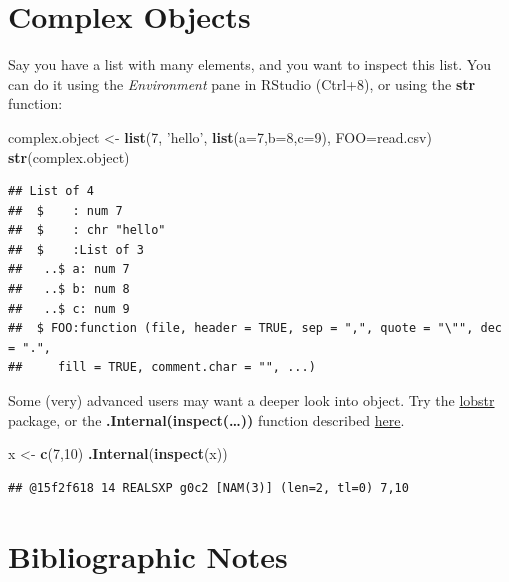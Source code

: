 \documentclass[]{book}
\newenvironment{Shaded}{\begin{snugshade}}{\end{snugshade}}
\newcommand{\KeywordTok}[1]{\textcolor[rgb]{0.13,0.29,0.53}{\textbf{#1}}}
\newcommand{\DataTypeTok}[1]{\textcolor[rgb]{0.13,0.29,0.53}{#1}}
\newcommand{\DecValTok}[1]{\textcolor[rgb]{0.00,0.00,0.81}{#1}}
\newcommand{\StringTok}[1]{\textcolor[rgb]{0.31,0.60,0.02}{#1}}
\newcommand{\NormalTok}[1]{#1}
\theoremstyle{definition}
\theoremstyle{definition}
\theoremstyle{definition}
\theoremstyle{remark}
\begin{document}
\section{Complex Objects}\label{complex-objects}

Say you have a list with many elements, and you want to inspect this
list. You can do it using the \emph{Environment} pane in RStudio
(Ctrl+8), or using the \textbf{str} function:

\begin{Shaded}
\begin{Highlighting}[]
\NormalTok{complex.object <-}\StringTok{ }\KeywordTok{list}\NormalTok{(}\DecValTok{7}\NormalTok{, }\StringTok{'hello'}\NormalTok{, }\KeywordTok{list}\NormalTok{(}\DataTypeTok{a=}\DecValTok{7}\NormalTok{,}\DataTypeTok{b=}\DecValTok{8}\NormalTok{,}\DataTypeTok{c=}\DecValTok{9}\NormalTok{), }\DataTypeTok{FOO=}\NormalTok{read.csv)}
\KeywordTok{str}\NormalTok{(complex.object)}
\end{Highlighting}
\end{Shaded}

\begin{verbatim}
## List of 4
##  $    : num 7
##  $    : chr "hello"
##  $    :List of 3
##   ..$ a: num 7
##   ..$ b: num 8
##   ..$ c: num 9
##  $ FOO:function (file, header = TRUE, sep = ",", quote = "\"", dec = ".", 
##     fill = TRUE, comment.char = "", ...)
\end{verbatim}

Some (very) advanced users may want a deeper look into object. Try the
\href{https://github.com/r-lib/lobstr/blob/master/README.md}{lobstr}
package, or the \textbf{.Internal(inspect(\ldots{}))} function described
\href{https://www.brodieg.com/2019/02/18/an-unofficial-reference-for-internal-inspect/}{here}.

\begin{Shaded}
\begin{Highlighting}[]
\NormalTok{x <-}\StringTok{ }\KeywordTok{c}\NormalTok{(}\DecValTok{7}\NormalTok{,}\DecValTok{10}\NormalTok{)}
\KeywordTok{.Internal}\NormalTok{(}\KeywordTok{inspect}\NormalTok{(x))}
\end{Highlighting}
\end{Shaded}

\begin{verbatim}
## @15f2f618 14 REALSXP g0c2 [NAM(3)] (len=2, tl=0) 7,10
\end{verbatim}

\section{Bibliographic Notes}\label{bibliographic-notes-1}
\end{document}
